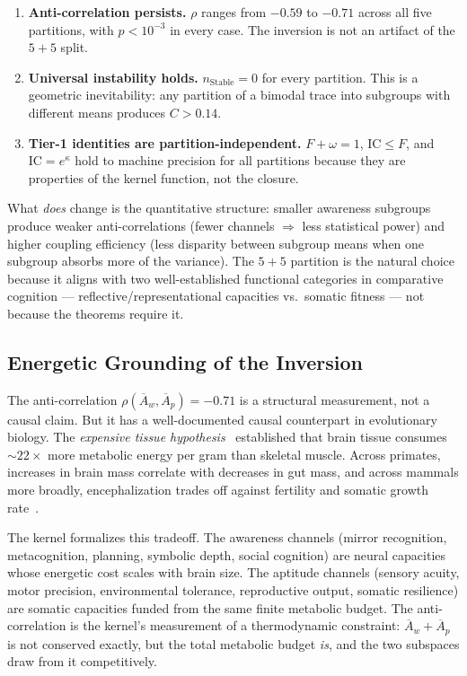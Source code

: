 \documentclass[
  aps,
  prd,
  twocolumn,
  superscriptaddress,
  nofootinbib,
  floatfix
]{revtex4-2}
\newcommand{\IC}{\mathrm{IC}}
\newcommand{\Aw}{\overline{A}_{\!w}}
\newcommand{\Ap}{\overline{A}_{\!p}}
\begin{document}
\begin{enumerate}
\item \textbf{Anti-correlation persists.}  $\rho$ ranges
  from $-0.59$ to $-0.71$ across all five partitions,
  with $p < 10^{-3}$ in every case.  The inversion is
  not an artifact of the $5\!+\!5$ split.
\item \textbf{Universal instability holds.}
  $n_{\mathrm{Stable}} = 0$ for every partition.  This is
  a geometric inevitability: any partition of a bimodal
  trace into subgroups with different means produces
  $C > 0.14$.
\item \textbf{Tier-1 identities are partition-independent.}
  $F + \omega = 1$, $\IC \leq F$, and $\IC = e^\kappa$
  hold to machine precision for all partitions because
  they are properties of the kernel function, not the
  closure.
\end{enumerate}

What \emph{does} change is the quantitative structure:
smaller awareness subgroups produce weaker anti-correlations
(fewer channels $\Rightarrow$ less statistical power) and
higher coupling efficiency (less disparity between subgroup
means when one subgroup absorbs more of the variance).
The $5\!+\!5$ partition is the natural choice because it
aligns with two well-established functional categories in
comparative cognition --- reflective/representational
capacities vs.\ somatic fitness --- not because the
theorems require it.

\subsection{Energetic Grounding of the Inversion}

The anti-correlation $\rho(\Aw, \Ap) = -0.71$ is a
structural measurement, not a causal claim.  But it has
a well-documented causal counterpart in evolutionary
biology.  The \emph{expensive tissue
hypothesis}~\cite{aiello1995expensive} established that
brain tissue consumes $\sim\!22\times$ more metabolic energy
per gram than skeletal muscle.  Across primates, increases
in brain mass correlate with decreases in gut mass, and
across mammals more broadly, encephalization trades off
against fertility and somatic growth
rate~\cite{isler2009expensive}.

The kernel formalizes this tradeoff.  The awareness channels
(mirror recognition, metacognition, planning, symbolic depth,
social cognition) are neural capacities whose energetic cost
scales with brain size.  The aptitude channels (sensory
acuity, motor precision, environmental tolerance,
reproductive output, somatic resilience) are somatic
capacities funded from the same finite metabolic budget.
The anti-correlation is the kernel's measurement of a
thermodynamic constraint: $\Aw + \Ap$ is not conserved
exactly, but the total metabolic budget \emph{is}, and
the two subspaces draw from it competitively.
\end{document}
